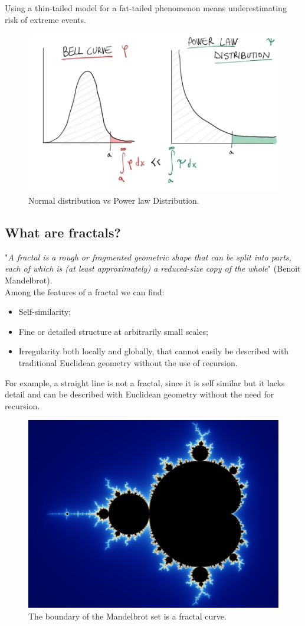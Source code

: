Using a thin-tailed model for a fat-tailed phenomenon means underestimating risk of extreme events.
\begin{figure} [H]
    \centering
    \includegraphics[width=0.65\linewidth]{img/WhatsApp Image 2025-10-04 at 22.22.36.png}
    \caption{Normal distribution vs Power law Distribution.}
\end{figure}

\subsection{What are fractals?}
"\textit{A fractal is a rough or fragmented geometric shape that can be split into parts, each of which is (at least approximately) a reduced-size copy of the whole}" (Benoit Mandelbrot). \\

Among the features of a fractal we can find:
\begin{itemize}
    \item Self-similarity;
    \item Fine or detailed structure at arbitrarily small scales;
    \item Irregularity both locally and globally, that cannot easily be described with traditional Euclidean geometry without the use of recursion.
\end{itemize}
For example, a straight line is not a fractal, since it is self similar but it lacks detail and can be described with Euclidean geometry without the need for recursion.
\begin{figure} [H]
    \centering
    \includegraphics[width=0.65\linewidth]{img/Mandel_zoom_00_mandelbrot_set.jpg}
    \caption{The boundary of the Mandelbrot set is a fractal curve.}
\end{figure}
